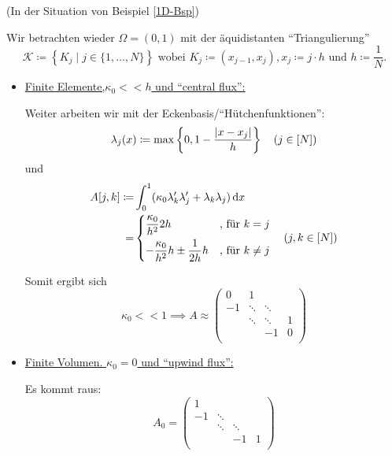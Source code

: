 \begin{examples}(In der Situation von Beispiel \ref{1D-Bsp})
	
	Wir betrachten wieder $ \Omega = (0,1) $ mit der äquidistanten \enquote{Triangulierung}
	 \[ \mathcal{K} \coloneqq \left\{K_j\mid j \in \{1, \dots ,N\}\right\} \text{ wobei } K_j \coloneqq (x_{j-1}, x_j), x_j \coloneqq j \cdot h \text{ und } h \coloneqq \frac{1}{N}.\]
	 
	 \begin{itemize}
	 	\item \underline{Finite Elemente,$ \kappa_0 << h $ und \enquote{central flux}:}
	 	
	 	Weiter arbeiten wir mit der Eckenbasis/\enquote{Hütchenfunktionen}:
	 	\[ \lambda_j(x) \coloneqq \max\left\{ 0, 1 - \frac{\abs{x-x_j}}{h} \right\} \quad (j \in [N])\]
	 	und 
	 	\begin{align*}
		 	A[j,k] \coloneqq& \int_{0}^{1} (\kappa_0 \lambda_k' \lambda_j' + \lambda_k \lambda_j) \mathop{}\!\mathrm{d} x\\
		 	=& \begin{dcases}
			 	\frac{\kappa_0}{h^2}2h &\text{, für } k = j\\
			 	-\frac{\kappa_0}{h^2} h \pm \frac{1}{2h} h &\text{, für } k \neq j
		 	\end{dcases} \quad (j,k\in[N])
	 	\end{align*}
	 	
	 	Somit ergibt sich
	 	\[\kappa_0 << 1 \implies A \approx \begin{pmatrix}
	 	0& 1& & \\
	 	-1& \ddots&\ddots & \\
	 	& \ddots& \ddots& 1\\
	 	& & -1& 0\\
	 	\end{pmatrix} \]
	 	
	 	\item \underline{Finite Volumen. $ \kappa_0 = 0 $ und \enquote{upwind flux}:}
	 	
	 	Es kommt raus:
	 	\[A_0 =  \begin{pmatrix}
	 	1& & & \\
	 	-1& \ddots& & \\
	 	& \ddots& \ddots& \\
	 	& & -1& 1\\
	 	\end{pmatrix}  \]
	 \end{itemize}
\end{examples}

